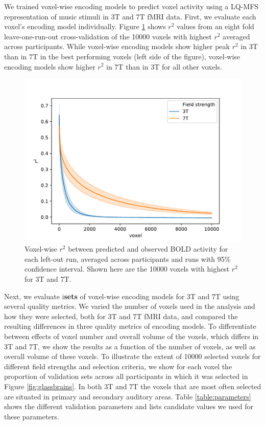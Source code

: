 We trained voxel-wise encoding models to predict voxel activity using a LQ-MFS representation of music stimuli in 3T and 7T f{MRI} data.
First, we evaluate each voxel's encoding model individually. Figure \ref{fig:r2_plot} shows $r^{2}$ values from an eight fold leave-one-run-out cross-validation of the 10000 voxels with highest $r^{2}$ averaged across participants. While voxel-wise encoding models show higher peak $r^{2}$ in 3T than in 7T in the best performing voxels (left side of the figure), voxel-wise encoding models show higher $r^{2}$ in 7T than in 3T for all other voxels.

\begin{figure}[!htb]
  \centering
  \includegraphics[width=\linewidth]{pics/r2_plot.pdf}
	
    \caption{Voxel-wise $r^{2}$ between predicted and observed BOLD activity for each left-out run, averaged across participants and runs with 95\% confidence interval. Shown here are the 10000 voxels with highest $r^{2}$ for 3T and 7T.
  }

 \label{fig:r2_plot}\end{figure}

Next, we evaluate i\textbf{sets} of voxel-wise encoding models for 3T and 7T using several quality metrics. We varied the number of voxels used in the analysis and how they were selected, both for 3T and 7T f{MRI} data, and compared the resulting differences in three quality metrics of encoding models. To differentiate between effects of voxel number and overall volume of the voxels, which differs in 3T and 7T, we show the results as a function of the number of voxels, as well as overall volume of these voxels.
To illustrate the extent of 10000 selected voxels for different field strengths and selection criteria, we show for each voxel the proportion of validation sets across all participants in which it was selected in Figure \ref{fig:glassbrains}. In both 3T and 7T the voxels that are most often selected are situated in primary and secondary auditory areas.
Table \ref{table:parameters} shows the different validation parameters and lists candidate values we used for these parameters.

